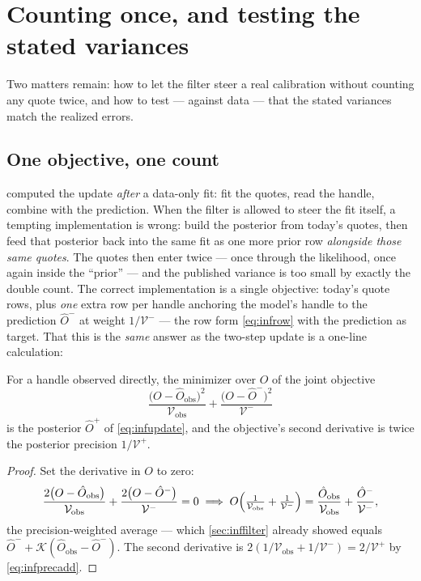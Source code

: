 \section{Counting once, and testing the stated variances}
\label{sec:infaudit}

Two matters remain: how to let the filter steer a real calibration
without counting any quote twice, and how to test --- against data
--- that the stated variances match the realized errors.

\subsection{One objective, one count}

 computed the update \emph{after} a data-only
fit: fit the quotes, read the handle, combine with the prediction.
When the filter is allowed to steer the fit itself, a tempting
implementation is wrong: build the posterior from today's quotes,
then feed that posterior back into the same fit as one more prior
row \emph{alongside those same quotes}.  The quotes then enter twice
--- once through the likelihood, once again inside the
``prior'' --- and the published variance is too small by exactly
the double count.  The correct implementation is a single objective:
today's quote rows, plus \emph{one} extra row per handle anchoring
the model's handle to the prediction $\hat O^{-}$ at weight
$1/\mathcal{V}^{-}$ --- the row form \cref{eq:infrow} with the
prediction as target.  That this is the \emph{same} answer as the
two-step update is a one-line calculation:

\begin{proposition}
\label{prop:infmap}
For a handle observed directly, the minimizer over $O$ of the joint
objective
\[
\frac{\bigl(O-\hat O_{\mathrm{obs}}\bigr)^2}{\mathcal{V}_{\mathrm{obs}}}
+\frac{\bigl(O-\hat O^{-}\bigr)^2}{\mathcal{V}^{-}}
\]
is the posterior $\hat O^{+}$ of \cref{eq:infupdate}, and the
objective's second derivative is twice the posterior precision
$1/\mathcal{V}^{+}$.
\end{proposition}

\begin{proof}
Set the derivative in $O$ to zero:
\[
\frac{2\bigl(O-\hat O_{\mathrm{obs}}\bigr)}{\mathcal{V}_{\mathrm{obs}}}
+\frac{2\bigl(O-\hat O^{-}\bigr)}{\mathcal{V}^{-}}=0
\;\Longrightarrow\;
O\Bigl(\tfrac{1}{\mathcal{V}_{\mathrm{obs}}}+\tfrac{1}{\mathcal{V}^{-}}\Bigr)
=\frac{\hat O_{\mathrm{obs}}}{\mathcal{V}_{\mathrm{obs}}}
+\frac{\hat O^{-}}{\mathcal{V}^{-}},
\]
the precision-weighted average --- which \cref{sec:inffilter}
already showed equals
$\hat O^{-}+\mathcal{K}(\hat O_{\mathrm{obs}}-\hat O^{-})$.  The
second derivative is
$2(1/\mathcal{V}_{\mathrm{obs}}+1/\mathcal{V}^{-})=2/\mathcal{V}^{+}$
by \cref{eq:infprecadd}.
\end{proof}

